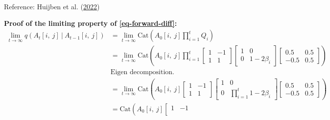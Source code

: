 \documentclass[
  11pt,
  letterpaper,
]{article}
\begin{document}
Reference: Huijben et al.
(\protect\hyperlink{ref-Huijben_Kool_Paulus_van_Sloun_2022}{2022})

\textbf{Proof of the limiting property of \ref{eq-forward-diff}:}
\begin{align*}
        \lim_{t \to \infty} q(A_t[i, \ j] \ | \ A_{t-1}[i, \ j]) 
        &= \lim_{t \to \infty} \text{Cat}\left(A_0[i, \ j] \prod_{i=1}^t Q_i \right) \\
        &= \lim_{t \to \infty} \text{Cat}
        \left(A_0[i, \ j] 
            \prod_{i=1}^t  
            \left[
            \begin{matrix}
                1  & -1 \\
                1 & 1
            \end{matrix}
            \right]
            \left[
            \begin{matrix}
                1  &  0 \\
                0 & 1-2\beta_i
            \end{matrix}
            \right]
            \left[
            \begin{matrix}
                0.5  &  0.5 \\
                -0.5 & 0.5
            \end{matrix}
            \right]
        \right) \\ 
        &\text{Eigen decomposition.} \\ 
        &= \lim_{t \to \infty} \text{Cat}
        \left(A_0[i, \ j] 
            \left[
            \begin{matrix}
                1  & -1 \\
                1 & 1
            \end{matrix}
            \right]
            \left[
            \begin{matrix}
                1  &  0 \\
                0 & \prod_{i=1}^t 1-2\beta_i
            \end{matrix}
            \right]
            \left[
            \begin{matrix}
                0.5  &  0.5 \\
                -0.5 & 0.5
            \end{matrix}
            \right]
        \right) \\ 
        &= \text{Cat}
        \left(A_0[i, \ j] 
            \left[
            \begin{matrix}
                1  & -1 \\

\end{matrix}
\end{align*}
\end{document}
